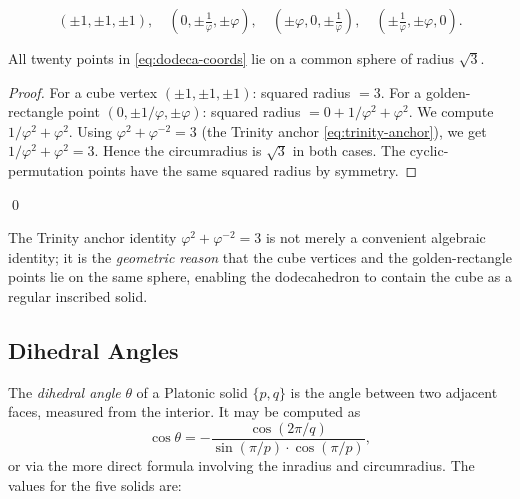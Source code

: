 \begin{equation}
  (\pm 1,\pm 1,\pm 1),\quad
  (0,\pm\tfrac{1}{\varphi},\pm\varphi),\quad
  (\pm\varphi,0,\pm\tfrac{1}{\varphi}),\quad
  (\pm\tfrac{1}{\varphi},\pm\varphi,0).
  \label{eq:dodeca-coords}
\end{equation}

\begin{proposition}
\label{prop:dodeca-circumradius}
All twenty points in \eqref{eq:dodeca-coords} lie on a common sphere of
radius $\sqrt{3}$.
\end{proposition}

\begin{proof}
For a cube vertex $(\pm 1, \pm 1, \pm 1)$: squared radius $= 3$.
For a golden-rectangle point $(0, \pm 1/\varphi, \pm\varphi)$:
squared radius $= 0 + 1/\varphi^2 + \varphi^2$.  We compute
$1/\varphi^2 + \varphi^2$.  Using $\varphi^2 + \varphi^{-2} = 3$
(the Trinity anchor \eqref{eq:trinity-anchor}), we get $1/\varphi^2 + \varphi^2 = 3$.
Hence the circumradius is $\sqrt{3}$ in both cases.  The cyclic-permutation
points have the same squared radius by symmetry.
\end{proof}
\qed

\begin{remark}
The Trinity anchor identity $\varphi^2 + \varphi^{-2} = 3$ is not merely
a convenient algebraic identity; it is the \emph{geometric reason} that the
cube vertices and the golden-rectangle points lie on the same sphere,
enabling the dodecahedron to contain the cube as a regular inscribed solid.
\end{remark}

\subsection{Dihedral Angles}
\label{sec:dihedral-angles}

The \emph{dihedral angle} $\theta$ of a Platonic solid $\{p,q\}$ is the
angle between two adjacent faces, measured from the interior.  It may be
computed as
\begin{equation}
  \cos\theta = -\frac{\cos(2\pi/q)}{\sin(\pi/p) \cdot \cos(\pi/p)},
  \label{eq:dihedral-general}
\end{equation}
or via the more direct formula involving the inradius and circumradius.
The values for the five solids are:

